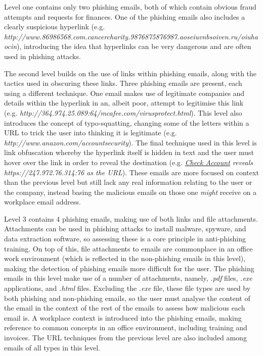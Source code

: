 \documentclass{l4proj}
\begin{document}
Level one contains only two phishing emails, both of which contain obvious fraud attempts and requests for finances. One of the phishing emails also includes a clearly suspicious hyperlink (e.g. \textit{http://www.86986568.com.cancercharity.9876875876987.aoseiuvnbsoiven.ru/oiuhaocin}), introducing the idea that hyperlinks can be very dangerous and are often used in phishing attacks. 

The second level builds on the use of links within phishing emails, along with the tactics used in obscuring these links. Three phishing emails are present, each using a different technique. One email makes use of legitimate companies and details within the hyperlink in an, albeit poor, attempt to legitimise this link (e.g.  \textit{http://364.974.25.089:64/mcafee.com/virusprotect.html}). This level also introduces the concept of typo-squatting, changing some of the letters within a URL to trick the user into thinking it is legitimate (e.g. \textit{http://www.anazon.com/accountsecurity}). The final technique used in this level is link obfuscation whereby the hyperlink itself is hidden in text and the user must hover over the link in order to reveal the destination (e.g. \textit{\underline{Check Account} reveals https://247.972.76.314:76 as the URL}). These emails are more focused on context than the previous level but still lack any real information relating to the user or the company, instead basing the malicious emails on those one \emph{might} receive on a workplace email address. 

Level 3 contains 4 phishing emails, making use of both links and file attachments. Attachments can be used in phishing attacks to install malware, spyware, and data extraction software, so assessing these is a core principle in anti-phishing training. On top of this, file attachments to emails are commonplace in an office work environment (which is reflected in the non-phishing emails in this level), making the detection of phishing emails more difficult for the user. The phishing emails in this level make use of a number of attachments, namely, \textit{.pdf} files, \textit{.exe} applications, and \textit{.html} files. Excluding the \textit{.exe} file, these file types are used by both phishing and non-phishing emails, so the user must analyse the content of the email in the context of the rest of the emails to assess how malicious each email is. A workplace context is introduced into the phishing emails, making reference to common concepts in an office environment, including training and invoices. The URL techniques from the previous level are also included among emails of all types in this level.
\end{document}
